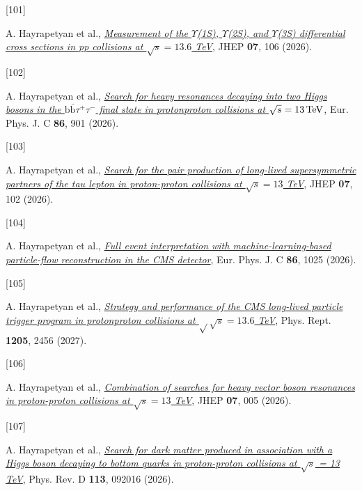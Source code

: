 \documentclass[
]{article}
\newlength{\cslhangindent}
\newlength{\csllabelwidth}
\newenvironment{CSLReferences}[2] %
 {\begin{list}{}{%
  \setlength{\itemindent}{0pt}
  \setlength{\leftmargin}{0pt}
  \setlength{\parsep}{0pt}
  \ifodd #1
   \setlength{\leftmargin}{\cslhangindent}
   \setlength{\itemindent}{-1\cslhangindent}
  \fi
  \setlength{\itemsep}{#2\baselineskip}}}
 {\end{list}}
\newcommand{\CSLLeftMargin}[1]{\parbox[t]{\csllabelwidth}{\strut#1\strut}}
\newcommand{\CSLRightInline}[1]{\parbox[t]{\linewidth - \csllabelwidth}{\strut#1\strut}}
\let\oldUpsilon\Upsilon
\renewcommand{\Upsilon}{\ensuremath{\oldUpsilon}}
\begin{document}
\begin{CSLReferences}{0}{0}
\CSLLeftMargin{{[}101{]} }%
\CSLRightInline{A. Hayrapetyan et al.,
\emph{\href{https://doi.org/10.1007/JHEP07(2026)106}{{Measurement of the
{\(\Upsilon\)}(1S), {\(\Upsilon\)}(2S), and {\(\Upsilon\)}(3S)
differential cross sections in pp collisions at \(\sqrt{s}=13.6\)
TeV}}}, JHEP \textbf{07}, 106 (2026).}

\CSLLeftMargin{{[}102{]} }%
\CSLRightInline{A. Hayrapetyan et al.,
\emph{\href{https://doi.org/10.1140/epjc/s10052-026-15699-9}{{Search for
heavy resonances decaying into two Higgs bosons in the
\({\text {b}}\bar{\textrm{b}}\tau ^{+}\tau ^{-}\) final state in
proton{\textendash}proton collisions at
\(\sqrt{s} = 13\,\text {Te\hspace{-.08em}V}\)}}}, Eur. Phys. J. C
\textbf{86}, 901 (2026).}

\CSLLeftMargin{{[}103{]} }%
\CSLRightInline{A. Hayrapetyan et al.,
\emph{\href{https://doi.org/10.1007/JHEP07(2026)102}{{Search for the
pair production of long-lived supersymmetric partners of the tau lepton
in proton-proton collisions at \(\sqrt{s}=13\) TeV}}}, JHEP \textbf{07},
102 (2026).}

\CSLLeftMargin{{[}104{]} }%
\CSLRightInline{A. Hayrapetyan et al.,
\emph{\href{https://doi.org/10.1140/epjc/s10052-026-15754-5}{{Full event
interpretation with machine-learning-based particle-flow reconstruction
in the CMS detector}}}, Eur. Phys. J. C \textbf{86}, 1025 (2026).}

\CSLLeftMargin{{[}105{]} }%
\CSLRightInline{A. Hayrapetyan et al.,
\emph{\href{https://doi.org/10.1016/j.physrep.2026.07.007}{{Strategy and
performance of the CMS long-lived particle trigger program in
proton{\textendash}proton collisions at {\(\sqrt{}\)}\(\sqrt{s}=13.6\)
TeV}}}, Phys. Rept. \textbf{1205}, 2456 (2027).}

\CSLLeftMargin{{[}106{]} }%
\CSLRightInline{A. Hayrapetyan et al.,
\emph{\href{https://doi.org/10.1007/JHEP07(2026)005}{{Combination of
searches for heavy vector boson resonances in proton-proton collisions
at \(\sqrt{s}=13\) TeV}}}, JHEP \textbf{07}, 005 (2026).}

\CSLLeftMargin{{[}107{]} }%
\CSLRightInline{A. Hayrapetyan et al.,
\emph{\href{https://doi.org/10.1103/2m87-3dlr}{{Search for dark matter
produced in association with a Higgs boson decaying to bottom quarks in
proton-proton collisions at \(\sqrt{s}\) = 13 TeV}}}, Phys. Rev. D
\textbf{113}, 092016 (2026).}


\end{CSLReferences}
\end{document}
